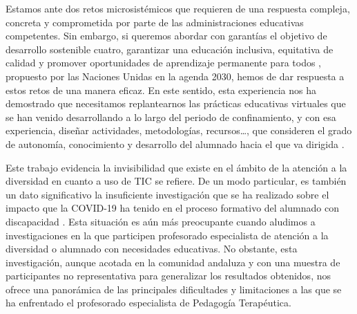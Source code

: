 \documentclass[spanish]{textolivre}
\begin{document}
Estamos ante dos retos microsistémicos que requieren de una respuesta compleja, concreta y comprometida por parte de las administraciones educativas competentes. Sin embargo, si queremos abordar con garantías el objetivo de desarrollo sostenible cuatro, garantizar una educación inclusiva, equitativa de calidad y promover oportunidades de aprendizaje permanente para todos \cite[p. 16]{onu2015}, %
propuesto por las Naciones Unidas en la agenda 2030, hemos de dar respuesta a estos retos de una manera eficaz. En este sentido, esta experiencia nos ha demostrado que necesitamos replantearnos las prácticas educativas virtuales que se han venido desarrollando a lo largo del periodo de confinamiento, y con esa experiencia, diseñar actividades, metodologías, recursos…, que consideren el grado de autonomía, conocimiento y desarrollo del alumnado hacia el que va dirigida \cite{moreno2020}. %

Este trabajo evidencia la invisibilidad que existe en el ámbito de la atención a la diversidad en cuanto a uso de TIC se refiere. De un modo particular, es también un dato significativo la insuficiente investigación que se ha realizado sobre el impacto que la COVID-19 ha tenido en el proceso formativo del alumnado con discapacidad \cite[p. 7]{vega2020}. %
Esta situación es aún más preocupante cuando aludimos a investigaciones en la que participen profesorado especialista de atención a la diversidad o alumnado con necesidades educativas. No obstante, esta investigación, aunque acotada en la comunidad andaluza y con una muestra de participantes no representativa para generalizar los resultados obtenidos, nos ofrece una panorámica de las principales dificultades y limitaciones a las que se ha enfrentado el profesorado especialista de Pedagogía Terapéutica. 

\printbibliography\label{sec-bibliography}
\end{document}

